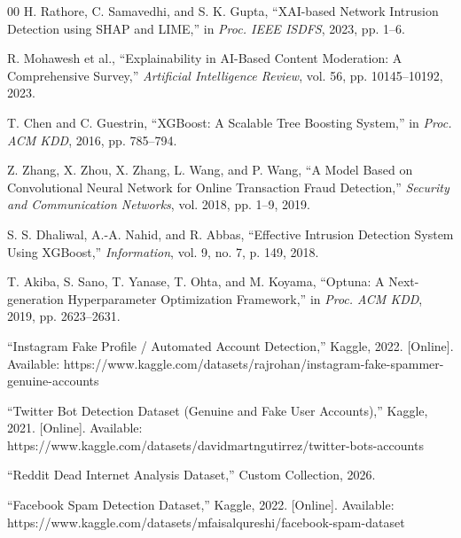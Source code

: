 \documentclass[conference]{IEEEtran}
\begin{document}
\begin{thebibliography}{00}
H. Rathore, C. Samavedhi, and S. K. Gupta, ``XAI-based Network Intrusion Detection using SHAP and LIME,'' in \textit{Proc. IEEE ISDFS}, 2023, pp. 1--6.

R. Mohawesh et al., ``Explainability in AI-Based Content Moderation: A Comprehensive Survey,'' \textit{Artificial Intelligence Review}, vol. 56, pp. 10145--10192, 2023.

T. Chen and C. Guestrin, ``XGBoost: A Scalable Tree Boosting System,'' in \textit{Proc. ACM KDD}, 2016, pp. 785--794.

Z. Zhang, X. Zhou, X. Zhang, L. Wang, and P. Wang, ``A Model Based on Convolutional Neural Network for Online Transaction Fraud Detection,'' \textit{Security and Communication Networks}, vol. 2018, pp. 1--9, 2019.

S. S. Dhaliwal, A.-A. Nahid, and R. Abbas, ``Effective Intrusion Detection System Using XGBoost,'' \textit{Information}, vol. 9, no. 7, p. 149, 2018.

T. Akiba, S. Sano, T. Yanase, T. Ohta, and M. Koyama, ``Optuna: A Next-generation Hyperparameter Optimization Framework,'' in \textit{Proc. ACM KDD}, 2019, pp. 2623--2631.

``Instagram Fake Profile / Automated Account Detection,'' Kaggle, 2022. [Online]. Available: https://www.kaggle.com/datasets/rajrohan/instagram-fake-spammer-genuine-accounts

``Twitter Bot Detection Dataset (Genuine and Fake User Accounts),'' Kaggle, 2021. [Online]. Available: https://www.kaggle.com/datasets/davidmartngutirrez/twitter-bots-accounts

``Reddit Dead Internet Analysis Dataset,'' Custom Collection, 2026.

``Facebook Spam Detection Dataset,'' Kaggle, 2022. [Online]. Available: https://www.kaggle.com/datasets/mfaisalqureshi/facebook-spam-dataset

\end{thebibliography}
\end{document}

